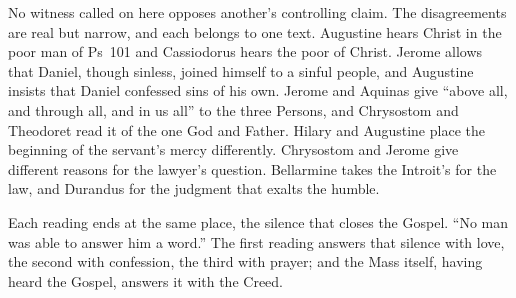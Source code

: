 No witness called on here opposes another's controlling claim. The
disagreements are real but narrow, and each belongs to one text. Augustine
hears Christ in the poor man of Ps~101 and Cassiodorus hears the poor of
Christ. Jerome allows that Daniel, though sinless, joined himself to a sinful
people, and Augustine insists that Daniel confessed sins of his own. Jerome
and Aquinas give ``above all, and through all, and in us all'' to the three
Persons, and Chrysostom and Theodoret read it of the one God and Father.
Hilary and Augustine place the beginning of the servant's mercy differently.
Chrysostom and Jerome give different reasons for the lawyer's question.
Bellarmine takes the Introit's  for the law, and Durandus for
the judgment that exalts the humble.

Each reading ends at the same place, the silence that closes the Gospel.
``No man was able to answer him a word.'' The first reading answers that
silence with love, the second with confession, the third with prayer; and the
Mass itself, having heard the Gospel, answers it with the Creed.
